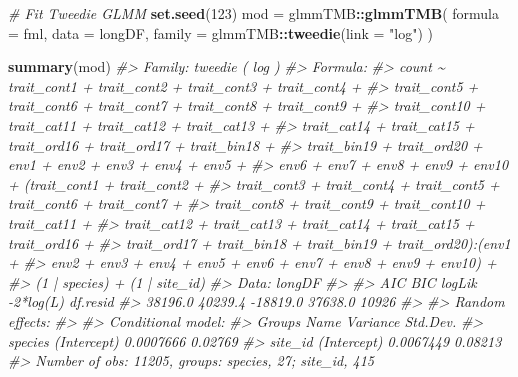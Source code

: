 \documentclass[
]{article}
\newenvironment{Shaded}{\begin{snugshade}}{\end{snugshade}}
\newcommand{\AttributeTok}[1]{\textcolor[rgb]{0.13,0.29,0.53}{#1}}
\newcommand{\CommentTok}[1]{\textcolor[rgb]{0.56,0.35,0.01}{\textit{#1}}}
\newcommand{\DecValTok}[1]{\textcolor[rgb]{0.00,0.00,0.81}{#1}}
\newcommand{\FunctionTok}[1]{\textcolor[rgb]{0.13,0.29,0.53}{\textbf{#1}}}
\newcommand{\NormalTok}[1]{#1}
\newcommand{\OtherTok}[1]{\textcolor[rgb]{0.56,0.35,0.01}{#1}}
\newcommand{\SpecialCharTok}[1]{\textcolor[rgb]{0.81,0.36,0.00}{\textbf{#1}}}
\newcommand{\StringTok}[1]{\textcolor[rgb]{0.31,0.60,0.02}{#1}}
\begin{document}
\begin{Shaded}
\begin{Highlighting}[]
\CommentTok{\# Fit Tweedie GLMM}
\FunctionTok{set.seed}\NormalTok{(}\DecValTok{123}\NormalTok{)}
\NormalTok{mod }\OtherTok{=}\NormalTok{ glmmTMB}\SpecialCharTok{::}\FunctionTok{glmmTMB}\NormalTok{(}
  \AttributeTok{formula =}\NormalTok{ fml,}
  \AttributeTok{data    =}\NormalTok{ longDF,}
  \AttributeTok{family  =}\NormalTok{ glmmTMB}\SpecialCharTok{::}\FunctionTok{tweedie}\NormalTok{(}\AttributeTok{link =} \StringTok{"log"}\NormalTok{)}
\NormalTok{)}

\FunctionTok{summary}\NormalTok{(mod)}
\CommentTok{\#\textgreater{}  Family: tweedie  ( log )}
\CommentTok{\#\textgreater{} Formula:          }
\CommentTok{\#\textgreater{} count \textasciitilde{} trait\_cont1 + trait\_cont2 + trait\_cont3 + trait\_cont4 +  }
\CommentTok{\#\textgreater{}     trait\_cont5 + trait\_cont6 + trait\_cont7 + trait\_cont8 + trait\_cont9 +  }
\CommentTok{\#\textgreater{}     trait\_cont10 + trait\_cat11 + trait\_cat12 + trait\_cat13 +  }
\CommentTok{\#\textgreater{}     trait\_cat14 + trait\_cat15 + trait\_ord16 + trait\_ord17 + trait\_bin18 +  }
\CommentTok{\#\textgreater{}     trait\_bin19 + trait\_ord20 + env1 + env2 + env3 + env4 + env5 +  }
\CommentTok{\#\textgreater{}     env6 + env7 + env8 + env9 + env10 + (trait\_cont1 + trait\_cont2 +  }
\CommentTok{\#\textgreater{}     trait\_cont3 + trait\_cont4 + trait\_cont5 + trait\_cont6 + trait\_cont7 +  }
\CommentTok{\#\textgreater{}     trait\_cont8 + trait\_cont9 + trait\_cont10 + trait\_cat11 +  }
\CommentTok{\#\textgreater{}     trait\_cat12 + trait\_cat13 + trait\_cat14 + trait\_cat15 + trait\_ord16 +  }
\CommentTok{\#\textgreater{}     trait\_ord17 + trait\_bin18 + trait\_bin19 + trait\_ord20):(env1 +  }
\CommentTok{\#\textgreater{}     env2 + env3 + env4 + env5 + env6 + env7 + env8 + env9 + env10) +  }
\CommentTok{\#\textgreater{}     (1 | species) + (1 | site\_id)}
\CommentTok{\#\textgreater{} Data: longDF}
\CommentTok{\#\textgreater{} }
\CommentTok{\#\textgreater{}       AIC       BIC    logLik {-}2*log(L)  df.resid }
\CommentTok{\#\textgreater{}   38196.0   40239.4  {-}18819.0   37638.0     10926 }
\CommentTok{\#\textgreater{} }
\CommentTok{\#\textgreater{} Random effects:}
\CommentTok{\#\textgreater{} }
\CommentTok{\#\textgreater{} Conditional model:}
\CommentTok{\#\textgreater{}  Groups  Name        Variance  Std.Dev.}
\CommentTok{\#\textgreater{}  species (Intercept) 0.0007666 0.02769 }
\CommentTok{\#\textgreater{}  site\_id (Intercept) 0.0067449 0.08213 }
\CommentTok{\#\textgreater{} Number of obs: 11205, groups:  species, 27; site\_id, 415}

\end{Highlighting}
\end{Shaded}
\end{document}
